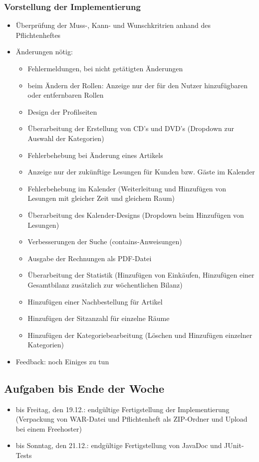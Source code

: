 \documentclass[12pt,a4paper]{article}
\begin{document}
\subsubsection*{Vorstellung der Implementierung}
\begin{itemize}
\item Überprüfung der Muss-, Kann- und Wunschkritrien anhand des Pflichtenheftes
\item Änderungen nötig:
\begin{itemize}
\item Fehlermeldungen, bei nicht getätigten Änderungen
\item beim Ändern der Rollen: Anzeige nur der für den Nutzer hinzufügbaren oder entfernbaren Rollen
\item Design der Profilseiten
\item Überarbeitung der Erstellung von CD's und DVD's (Dropdown zur Auswahl der Kategorien)
\item Fehlerbehebung bei Änderung eines Artikels
\item Anzeige nur der zukünftige Lesungen für Kunden bzw. Gäste im Kalender
\item Fehlerbehebung im Kalender (Weiterleitung und Hinzufügen von Lesungen mit gleicher Zeit und gleichem Raum)
\item Überarbeitung des Kalender-Designs (Dropdown beim Hinzufügen von Lesungen)
\item Verbesserungen der Suche (contains-Anweisungen)
\item Ausgabe der Rechnungen als PDF-Datei
\item Überarbeitung der Statistik (Hinzufügen von Einkäufen, Hinzufügen einer Gesamtbilanz zusätzlich zur wöchentlichen Bilanz)
\item Hinzufügen einer Nachbestellung für Artikel
\item Hinzufügen der Sitzanzahl für einzelne Räume
\item Hinzufügen der Kategoriebearbeitung (Löschen und Hinzufügen einzelner Kategorien)
\end{itemize}
\item Feedback: noch Einiges zu tun
\end{itemize}

\subsection*{Aufgaben bis Ende der Woche}
\medskip
\begin{itemize}
\item bis Freitag, den 19.12.: endgültige Fertigstellung der Implementierung (Verpackung von WAR-Datei und Pflichtenheft als ZIP-Ordner und Upload bei einem Freehoster)
\item bis Sonntag, den 21.12.: endgültige Fertigstellung von JavaDoc und JUnit-Tests
\end{itemize}
\end{document}
